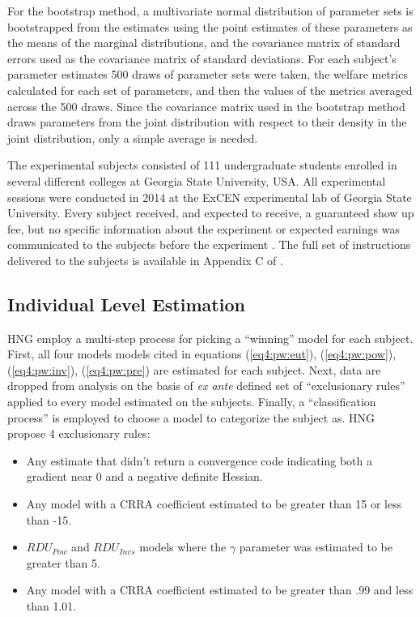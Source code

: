 \documentclass[../main.tex]{subfiles}
\begin{document}
For the bootstrap method, a multivariate normal distribution of parameter sets is bootstrapped from the estimates using the point estimates of these parameters as the means of the marginal distributions, and the covariance matrix of standard errors used as the covariance matrix of standard deviations.
For each subject's parameter estimates 500 draws of parameter sets were taken, the welfare metrics calculated for each set of parameters, and then the values of the metrics averaged across the 500 draws.
Since the covariance matrix used in the bootstrap method draws parameters from the joint distribution with respect to their density in the joint distribution, only a simple average is needed.

The experimental subjects consisted of 111 undergraduate students enrolled in several different colleges at Georgia State University, USA.
All experimental sessions were conducted in 2014 at the ExCEN experimental lab of Georgia State University.
Every subject received, and expected to receive, a guaranteed  show up fee, but no specific information about the experiment or expected earnings was communicated to the subjects before the experiment \parencite[98]{Harrison2016}.
The full set of instructions delivered to the subjects is available in Appendix C of \textcite{Harrison2016}.

\subsection{Individual Level Estimation}
\label{sec4:ILE}

HNG employ a multi-step process for picking a \enquote{winning} model for each subject.
First, all four models models cited in equations (\ref{eq4:pw:eut}), (\ref{eq4:pw:pow}), (\ref{eq4:pw:inv}), (\ref{eq4:pw:pre}) are estimated for each subject.
Next, data are dropped from analysis on the basis of \textit{ex ante} defined set of \enquote{exclusionary rules} applied to every model estimated on the subjects.
Finally, a \enquote{classification process} is employed to choose a model to categorize the subject as.
HNG propose 4 exclusionary rules:
\begin{itemize}
	\item Any estimate that didn't return a convergence code indicating both a gradient near 0 and a negative definite Hessian.
	\item Any model with a CRRA coefficient estimated to be greater than 15 or less than -15.
	\item $\mathit{RDU_{Pow}}$ and $\mathit{RDU_{Invs}}$ models where the $\gamma$ parameter was estimated to be greater than 5.
	\item Any model with a CRRA coefficient estimated to be greater than .99 and less than 1.01.
\end{itemize}
\end{document}
